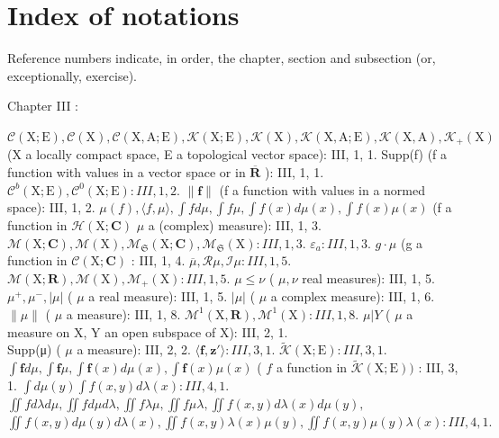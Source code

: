 \chapter*{Index of notations}
{}

Reference numbers indicate, in order, the chapter, section and subsection (or, exceptionally, exercise).

Chapter III :

\(\mathcal{C}(\mathrm{X};\mathrm{E}),\mathcal{C}(\mathrm{X}),\mathcal{C}(\mathrm{X},\mathrm{A};\mathrm{E}),\mathcal{K}(\mathrm{X};\mathrm{E}),\mathcal{K}(\mathrm{X}),\mathcal{K}(\mathrm{X},\mathrm{A};\mathrm{E}),\mathcal{K}(\mathrm{X},\mathrm{A}),\mathcal{K}_{+}(\mathrm{X})\) (X a locally compact space, E a topological vector space): III, 1, 1. Supp(f) (f a function with values in a vector space or in \(\overline{\mathbf{R}}\) ): III, 1, 1. \(\mathcal{C}^b (\mathrm{X};\mathrm{E}),\mathcal{C}^0 (\mathrm{X};\mathrm{E}):III,1,2.\) \(\| \mathbf{f}\|\) (f a function with values in a normed space): III, 1, 2. \(\mu (f),\langle f,\mu \rangle ,\int fd\mu ,\int f\mu ,\int f(x)d\mu (x),\int f(x)\mu (x)\) (f a function in \(\mathcal{H}(\mathrm{X};\mathbf{C})\) \(\mu\) a (complex) measure): III, 1, 3. \(\mathcal{M}(\mathrm{X};\mathbf{C}),\mathcal{M}(\mathrm{X}),\mathcal{M}_{\mathfrak{S}}(\mathrm{X};\mathbf{C}),\mathcal{M}_{\mathfrak{S}}(\mathrm{X}):III,1,3.\) \(\varepsilon_{a}:III,1,3.\) \(g\cdot \mu\) (g a function in \(\mathcal{C}(\mathrm{X};\mathbf{C})\) : III, 1, 4. \(\overline{\mu},\mathcal{R}\mu ,\mathcal{I}\mu :III,1,5.\) \(\mathcal{M}(\mathrm{X};\mathbf{R}),\mathcal{M}(\mathrm{X}),\mathcal{M}_{+}(\mathrm{X}):III,1,5.\) \(\mu \leqslant \nu\) ( \(\mu ,\nu\) real measures): III, 1, 5. \(\mu^{+},\mu^{-},|\mu |\) ( \(\mu\) a real measure): III, 1, 5. \(|\mu |\) ( \(\mu\) a complex measure): III, 1, 6. \(\| \mu \|\) ( \(\mu\) a measure): III, 1, 8. \(\mathcal{M}^1 (\mathrm{X},\mathbf{R}),\mathcal{M}^1 (\mathrm{X}):III,1,8.\) \(\mu |Y\) ( \(\mu\) a measure on X, Y an open subspace of X): III, 2, 1.\\
Supp(μ) ( \(\mu\) a measure): III, 2, 2. \(\langle \mathbf{f},\mathbf{z}'\rangle :III,3,1.\) \(\widetilde{\mathcal{K}} (\mathrm{X};\mathrm{E}):III,3,1.\) \(\int \mathbf{f}d\mu ,\int \mathbf{f}\mu ,\int \mathbf{f}(x)d\mu (x),\int \mathbf{f}(x)\mu (x)\) ( \(f\) a function in \(\widetilde{\mathcal{K}} (\mathrm{X};\mathrm{E}))\) : III, 3, 1. \(\int d\mu (y)\int f(x,y)d\lambda (x):III,4,1.\) \(\iint f d\lambda d\mu ,\iint f d\mu d\lambda ,\iint f\lambda \mu ,\iint f\mu \lambda ,\iint f(x,y)d\lambda (x)d\mu (y),\) \(\iint f(x,y)d\mu (y)d\lambda (x),\iint f(x,y)\lambda (x)\mu (y),\iint f(x,y)\mu (y)\lambda (x):III,4,1.\)

